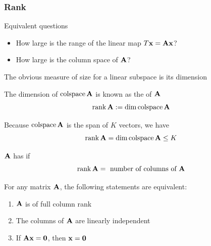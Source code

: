 \begin{frame}
    \frametitle{Rank}

    \vspace{2em}
    Equivalent questions
    \begin{itemize}
        \item How large is the range of the linear map $T {\mathbf x} = \mathbf A {\mathbf x}$?
        \item How large is the column space of $\mathbf A$?
    \end{itemize}

    \vspace{1em}

    The obvious measure of size for a linear subspace is its dimension
    
    The dimension of $\operatorname{colspace} \mathbf A$ is known as the  of $\mathbf A$  
    \begin{equation*}
        \operatorname{rank} \mathbf A := \dim \operatorname{colspace} \mathbf A
    \end{equation*}

    Because $\operatorname{colspace} \mathbf A$ is the span of $K$ vectors, we have
    \begin{equation*}
        \operatorname{rank} \mathbf A = \operatorname{dim} \operatorname{colspace} \mathbf A \leq K
    \end{equation*}


\end{frame}


\begin{frame}
    
    \vspace{2em}
    $\mathbf A$ has  if 
    \begin{equation*}
        \operatorname{rank} \mathbf A = \text{ number of columns of } \mathbf A
    \end{equation*}

    \vspace{.7em}
    \Fact{\eqref{ET-fa:frie}} For any matrix $\mathbf A$,  the following statements are equivalent:
    \begin{enumerate}
        \item $\mathbf A$ is of full column rank
            \vspace{0.3em} 
        \item The columns of $\mathbf A$ are linearly independent
            \vspace{0.3em} 
        \item If $\mathbf A {\mathbf x} = {\mathbf 0}$, then ${\mathbf x} = {\mathbf 0}$
    \end{enumerate}

\end{frame}

